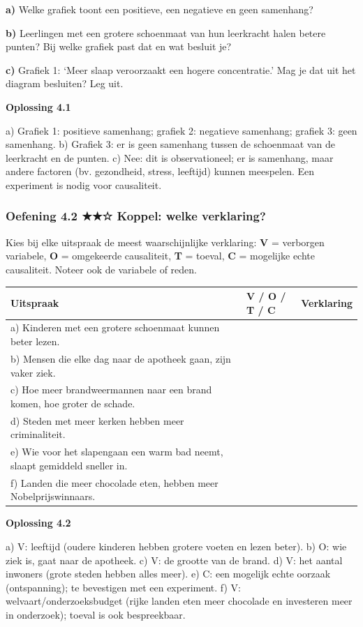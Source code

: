 \textbf{a)} Welke grafiek toont een positieve, een negatieve en geen samenhang? \lijn

\textbf{b)} Leerlingen met een grotere schoenmaat van hun leerkracht halen betere punten? Bij welke grafiek past dat en wat besluit je? \lijn

\textbf{c)} Grafiek 1: ‘Meer slaap veroorzaakt een hogere concentratie.’ Mag je dat uit het diagram besluiten? Leg uit. \lijn

\begin{oplossing}
\textbf{Oplossing 4.1}

a) Grafiek 1: positieve samenhang; grafiek 2: negatieve samenhang; grafiek 3: geen samenhang. b) Grafiek 3: er is geen samenhang tussen de schoenmaat van de leerkracht en de punten. c) Nee: dit is observationeel; er is samenhang, maar andere factoren (bv. gezondheid, stress, leeftijd) kunnen meespelen. Een experiment is nodig voor causaliteit.
\end{oplossing}

\subsubsection*{Oefening 4.2 \quad ★★☆ \quad Koppel: welke verklaring?}

Kies bij elke uitspraak de meest waarschijnlijke verklaring: \textbf{V} = verborgen variabele, \textbf{O} = omgekeerde causaliteit, \textbf{T} = toeval, \textbf{C} = mogelijke echte causaliteit. Noteer ook de variabele of reden.

\begin{tabular}{lll}
\hline
Uitspraak & V / O / T / C & Verklaring \\
\hline
a) Kinderen met een grotere schoenmaat kunnen beter lezen. & & \\
b) Mensen die elke dag naar de apotheek gaan, zijn vaker ziek. & & \\
c) Hoe meer brandweermannen naar een brand komen, hoe groter de schade. & & \\
d) Steden met meer kerken hebben meer criminaliteit. & & \\
e) Wie voor het slapengaan een warm bad neemt, slaapt gemiddeld sneller in. & & \\
f) Landen die meer chocolade eten, hebben meer Nobelprijswinnaars. & & \\
\hline
\end{tabular}

\begin{oplossing}
\textbf{Oplossing 4.2}

a) V: leeftijd (oudere kinderen hebben grotere voeten en lezen beter). b) O: wie ziek is, gaat naar de apotheek. c) V: de grootte van de brand. d) V: het aantal inwoners (grote steden hebben alles meer). e) C: een mogelijk echte oorzaak (ontspanning); te bevestigen met een experiment. f) V: welvaart/onderzoeksbudget (rijke landen eten meer chocolade en investeren meer in onderzoek); toeval is ook bespreekbaar.
\end{oplossing}

